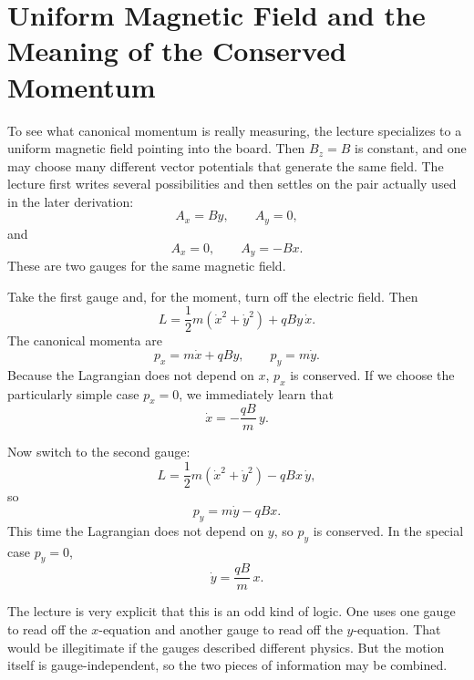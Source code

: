 \section{Uniform Magnetic Field and the Meaning of the Conserved Momentum}

To see what canonical momentum is really measuring, the lecture specializes to a uniform magnetic field pointing into the board. Then \(B_z=B\) is constant, and one may choose many different vector potentials that generate the same field. The lecture first writes several possibilities and then settles on the pair actually used in the later derivation:
\begin{equation}
A_x=By,\qquad A_y=0,
\end{equation}
and
\begin{equation}
A_x=0,\qquad A_y=-Bx.
\end{equation}
These are two gauges for the same magnetic field.

Take the first gauge and, for the moment, turn off the electric field. Then
\begin{equation}
L=\frac12 m(\dot x^2+\dot y^2)+qBy\,\dot x.
\end{equation}
The canonical momenta are
\begin{equation}
p_x=m\dot x+qBy,
\qquad
p_y=m\dot y.
\end{equation}
Because the Lagrangian does not depend on \(x\), \(p_x\) is conserved. If we choose the particularly simple case \(p_x=0\), we immediately learn that
\begin{equation}
\dot x=-\frac{qB}{m}\,y.
\end{equation}

Now switch to the second gauge:
\begin{equation}
L=\frac12 m(\dot x^2+\dot y^2)-qBx\,\dot y,
\end{equation}
so
\begin{equation}
p_y=m\dot y-qBx.
\end{equation}
This time the Lagrangian does not depend on \(y\), so \(p_y\) is conserved. In the special case \(p_y=0\),
\begin{equation}
\dot y=\frac{qB}{m}\,x.
\end{equation}

The lecture is very explicit that this is an odd kind of logic. One uses one gauge to read off the \(x\)-equation and another gauge to read off the \(y\)-equation. That would be illegitimate if the gauges described different physics. But the motion itself is gauge-independent, so the two pieces of information may be combined.

